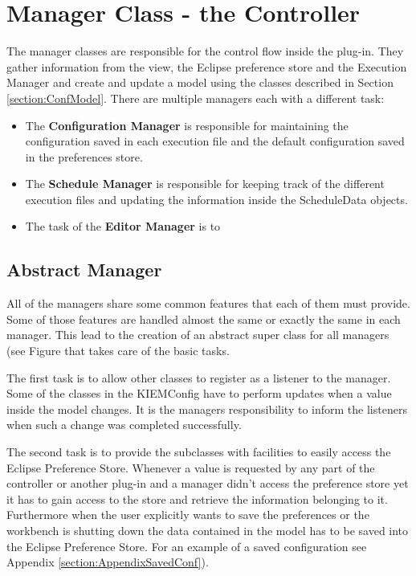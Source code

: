 \section{Manager Class - the Controller}
\label{section:ConfController}
The manager classes are responsible for the control flow inside the plug-in. They gather information
from the view, the Eclipse preference store and the Execution Manager and create and update a
model using the classes described in Section \ref{section:ConfModel}. There are multiple managers
each with a different task:
\begin{itemize}
 \item The \textbf{Configuration Manager} is responsible for maintaining the configuration saved in
each execution file and the default configuration saved in the preferences store.
 \item The \textbf{Schedule Manager} is responsible for keeping track of the different
execution files and updating the information inside the ScheduleData objects.
 \item The task of the \textbf{Editor Manager} is to
\end{itemize}



\subsection{Abstract Manager}
\label{section:AbstractManager}
All of the managers share some common features that each of them must provide. Some of those
features are handled almost the same or exactly the same in each manager. This lead to the creation
of an abstract super class for all managers (see Figure  %
that takes care of the basic tasks.

The first task is to allow other classes to register as a listener to the manager. Some of the classes
in the \ac{KIEMConfig} have to perform updates when a value inside the model changes. It is the managers
responsibility to inform the listeners when such a change was completed successfully.

The second task is to provide the subclasses with facilities to easily access the Eclipse Preference Store.
Whenever a value is requested by any part of the controller or another plug-in and a manager didn't access
the preference store yet it has to gain access to the store and retrieve the information belonging to it.
Furthermore when the user explicitly wants to save the preferences or the workbench is shutting down the
data contained in the model has to be saved into the Eclipse Preference Store. For an example of a 
saved configuration see Appendix \ref{section:AppendixSavedConf}).


